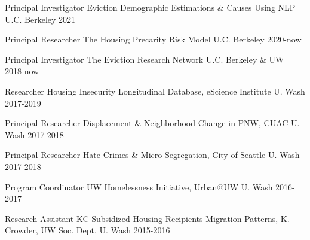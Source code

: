 



\begin{cvhonors}

  \cvhonor
    {Principal Investigator} %
    {Eviction Demographic Estimations \& Causes Using NLP} %
    {U.C. Berkeley} %
    {2021} %

  \cvhonor
    {Principal Researcher} %
    {The Housing Precarity Risk Model} %
    {U.C. Berkeley} %
    {2020-now} %

  \cvhonor
    {Principal Investigator} %
    {The Eviction Research Network} %
    {U.C. Berkeley \& UW} %
    {2018-now} %

  \cvhonor
    {Researcher} %
    {Housing Insecurity Longitudinal Database, eScience Institute} %
    {U. Wash} %
    {2017-2019} %

  \cvhonor
    {Principal Researcher} %
    {Displacement \& Neighborhood Change in PNW, CUAC} %
    {U. Wash} %
    {2017-2018} %

  \cvhonor
    {Principal Researcher} %
    {Hate Crimes \& Micro-Segregation, City of Seattle} %
    {U. Wash} %
    {2017-2018} %

  \cvhonor
    {Program Coordinator} %
    {UW Homelessness Initiative, Urban@UW} %
    {U. Wash} %
    {2016-2017} %

  \cvhonor
    {Research Assistant} %
    {KC Subsidized Housing Recipients Migration Patterns, K. Crowder, UW Soc. Dept.} %
    {U. Wash} %
    {2015-2016} %


\end{cvhonors}
